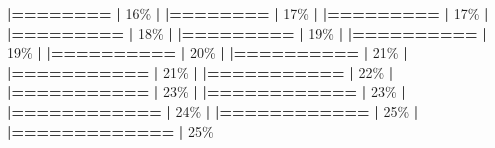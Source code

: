 \documentclass[
]{book}
\newenvironment{Shaded}{\begin{snugshade}}{\end{snugshade}}
\newcommand{\DecValTok}[1]{\textcolor[rgb]{0.00,0.00,0.81}{#1}}
\newcommand{\ErrorTok}[1]{\textcolor[rgb]{0.64,0.00,0.00}{\textbf{#1}}}
\newcommand{\NormalTok}[1]{#1}
\newcommand{\SpecialCharTok}[1]{\textcolor[rgb]{0.81,0.36,0.00}{\textbf{#1}}}
\begin{document}
\begin{Shaded}
\begin{Highlighting}[]
  \ErrorTok{|========}                                          \ErrorTok{|}  \DecValTok{16}\NormalTok{\%}
  \SpecialCharTok{|}                                                        
  \ErrorTok{|========}                                          \ErrorTok{|}  \DecValTok{17}\NormalTok{\%}
  \SpecialCharTok{|}                                                        
  \ErrorTok{|=========}                                         \ErrorTok{|}  \DecValTok{17}\NormalTok{\%}
  \SpecialCharTok{|}                                                        
  \ErrorTok{|=========}                                         \ErrorTok{|}  \DecValTok{18}\NormalTok{\%}
  \SpecialCharTok{|}                                                        
  \ErrorTok{|=========}                                         \ErrorTok{|}  \DecValTok{19}\NormalTok{\%}
  \SpecialCharTok{|}                                                        
  \ErrorTok{|==========}                                        \ErrorTok{|}  \DecValTok{19}\NormalTok{\%}
  \SpecialCharTok{|}                                                        
  \ErrorTok{|==========}                                        \ErrorTok{|}  \DecValTok{20}\NormalTok{\%}
  \SpecialCharTok{|}                                                        
  \ErrorTok{|==========}                                        \ErrorTok{|}  \DecValTok{21}\NormalTok{\%}
  \SpecialCharTok{|}                                                        
  \ErrorTok{|===========}                                       \ErrorTok{|}  \DecValTok{21}\NormalTok{\%}
  \SpecialCharTok{|}                                                        
  \ErrorTok{|===========}                                       \ErrorTok{|}  \DecValTok{22}\NormalTok{\%}
  \SpecialCharTok{|}                                                        
  \ErrorTok{|===========}                                       \ErrorTok{|}  \DecValTok{23}\NormalTok{\%}
  \SpecialCharTok{|}                                                        
  \ErrorTok{|============}                                      \ErrorTok{|}  \DecValTok{23}\NormalTok{\%}
  \SpecialCharTok{|}                                                        
  \ErrorTok{|============}                                      \ErrorTok{|}  \DecValTok{24}\NormalTok{\%}
  \SpecialCharTok{|}                                                        
  \ErrorTok{|============}                                      \ErrorTok{|}  \DecValTok{25}\NormalTok{\%}
  \SpecialCharTok{|}                                                        
  \ErrorTok{|=============}                                     \ErrorTok{|}  \DecValTok{25}\NormalTok{\%}

\end{Highlighting}
\end{Shaded}
\end{document}
